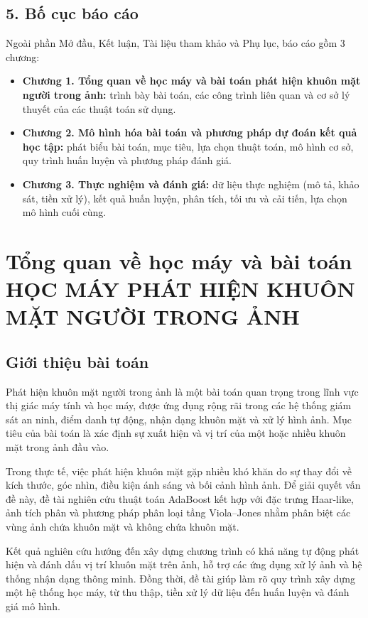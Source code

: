 \documentclass[12pt,a4paper,oneside]{report}
\newcommand{\tenbaitoan}{dự đoán kết quả học tập} %
\begin{document}
\section*{5. Bố cục báo cáo}
Ngoài phần Mở đầu, Kết luận, Tài liệu tham khảo và Phụ lục, báo cáo gồm
3 chương:
\begin{itemize}
  \item \textbf{Chương 1. Tổng quan về học máy và bài toán phát hiện khuôn mặt người trong ảnh:} trình bày bài toán,
        các công trình liên quan và cơ sở lý thuyết của các thuật toán sử dụng.
  \item \textbf{Chương 2. Mô hình hóa bài toán và phương pháp \tenbaitoan:} phát biểu bài
        toán, mục tiêu, lựa chọn thuật toán, mô hình cơ sở, quy trình huấn
        luyện và phương pháp đánh giá.
  \item \textbf{Chương 3. Thực nghiệm và đánh giá:} dữ liệu thực nghiệm (mô
        tả, khảo sát, tiền xử lý), kết quả huấn luyện, phân tích, tối ưu và
        cải tiến, lựa chọn mô hình cuối cùng.
\end{itemize}

\chapter{Tổng quan về học máy và bài toán HỌC MÁY PHÁT HIỆN KHUÔN MẶT
NGƯỜI TRONG ẢNH}
\label{chap:tongquan}

\section{Giới thiệu bài toán }
{Phát hiện khuôn mặt người trong ảnh là một bài toán quan trọng trong lĩnh vực thị giác máy tính và học máy, được ứng dụng rộng rãi trong các hệ thống giám sát an ninh, điểm danh tự động, nhận dạng khuôn mặt và xử lý hình ảnh. Mục tiêu của bài toán là xác định sự xuất hiện và vị trí của một hoặc nhiều khuôn mặt trong ảnh đầu vào.

Trong thực tế, việc phát hiện khuôn mặt gặp nhiều khó khăn do sự thay đổi về kích thước, góc nhìn, điều kiện ánh sáng và bối cảnh hình ảnh. Để giải quyết vấn đề này, đề tài nghiên cứu thuật toán AdaBoost kết hợp với đặc trưng Haar-like, ảnh tích phân và phương pháp phân loại tầng Viola–Jones nhằm phân biệt các vùng ảnh chứa khuôn mặt và không chứa khuôn mặt.

Kết quả nghiên cứu hướng đến xây dựng chương trình có khả năng tự động phát hiện và đánh dấu vị trí khuôn mặt trên ảnh, hỗ trợ các ứng dụng xử lý ảnh và hệ thống nhận dạng thông minh. Đồng thời, đề tài giúp làm rõ quy trình xây dựng một hệ thống học máy, từ thu thập, tiền xử lý dữ liệu đến huấn luyện và đánh giá mô hình.}
\end{document}
